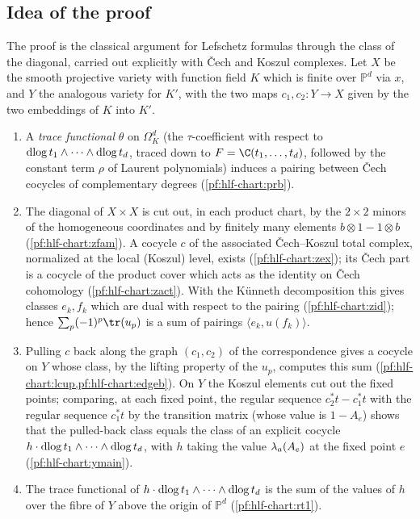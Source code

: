 \subsection*{Idea of the proof}
The proof is the classical argument for Lefschetz formulas through the class of the diagonal, carried out explicitly with \v{C}ech and
Koszul complexes. Let $X$ be the smooth projective variety with function field $K$ which is finite over $\mathbb P^d$ via $x$, and $Y$ the
analogous variety for $K'$, with the two maps $c_1,c_2\colon Y\to X$ given by the two embeddings of $K$ into $K'$.
\begin{enumerate}[label=(\arabic*),nosep]
\item A \emph{trace functional} $\theta$ on $\Omega^d_K$ (the $\tau$-coefficient with respect to $\operatorname{dlog} t_1\wedge\dots\wedge\operatorname{dlog} t_d$, traced
down to $F=\C(t_1,\dots,t_d)$, followed by the constant term $\rho$ of Laurent polynomials) induces a pairing between \v{C}ech cocycles of
complementary degrees (\cref{pf:hlf-chart:prb}).
\item The diagonal of $X\times X$ is cut out, in each product chart, by the $2\times2$ minors of the homogeneous coordinates and by
finitely many elements $b\otimes1-1\otimes b$ (\cref{pf:hlf-chart:zfam}). A cocycle $c$ of the associated \v{C}ech--Koszul total complex,
normalized at the local (Koszul) level, exists (\cref{pf:hlf-chart:zex}); its \v{C}ech part is a cocycle of the product cover which acts as the
identity on \v{C}ech cohomology (\cref{pf:hlf-chart:zact}). With the K\"unneth decomposition this gives classes $e_k,f_k$ which are dual
with respect to the pairing (\cref{pf:hlf-chart:zid}); hence $\sum_p(-1)^p\tr(u_p)$ is a sum of pairings $\langle e_k,u(f_k)\rangle$.
\item Pulling $c$ back along the graph $(c_1,c_2)$ of the correspondence gives a cocycle on $Y$ whose class, by the lifting property of the
$u_p$, computes this sum (\cref{pf:hlf-chart:lcup,pf:hlf-chart:edgeb}). On $Y$ the Koszul elements cut out the fixed points; comparing,
at each fixed point, the regular sequence $c_2^*t-c_1^*t$ with the regular sequence $c_1^*t$ by the transition matrix (whose value is
$1-A_e$) shows that the pulled-back class equals the class of an explicit cocycle $h\cdot\operatorname{dlog} t_1\wedge\dots\wedge\operatorname{dlog} t_d$, with $h$
taking the value $\lambda_a(A_e)$ at the fixed point $e$ (\cref{pf:hlf-chart:ymain}).
\item The trace functional of $h\cdot\operatorname{dlog} t_1\wedge\dots\wedge\operatorname{dlog} t_d$ is the sum of the values of $h$ over the fibre of $Y$ above the
origin of $\mathbb P^d$ (\cref{pf:hlf-chart:rt1}).
\end{enumerate}

